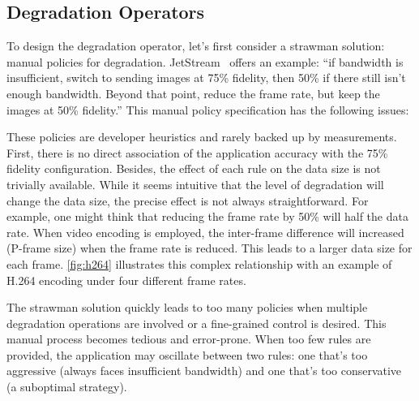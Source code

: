 \subsection{Degradation Operators}
\label{sec:prog-abs}

To design the degradation operator, let's first consider a strawman solution:
manual policies for degradation. JetStream~\cite{rabkin2014aggregation} offers
an example: ``if bandwidth is insufficient, switch to sending images at 75\%
fidelity, then 50\% if there still isn't enough bandwidth. Beyond that point,
reduce the frame rate, but keep the images at 50\% fidelity.'' This manual
policy specification has the following issues:

 These policies are developer heuristics and rarely
backed up by measurements. First, there is no direct association of the
application accuracy with the 75\% fidelity configuration. Besides, the effect
of each rule on the data size is not trivially available.  While it seems
intuitive that the level of degradation will change the data size, the precise
effect is not always straightforward. For example, one might think that reducing
the frame rate by 50\% will half the data rate. When video encoding is employed,
the inter-frame difference will increased (P-frame size) when the frame rate is
reduced. This leads to a larger data size for each frame. \autoref{fig:h264}
illustrates this complex relationship with an example of H.264 encoding under
four different frame rates.

 The strawman solution quickly leads to too many policies
when multiple degradation operations are involved or a fine-grained control is
desired. This manual process becomes tedious and error-prone. When too few rules
are provided, the application may oscillate between two rules: one that's too
aggressive (always faces insufficient bandwidth) and one that's too conservative
(a suboptimal strategy).

